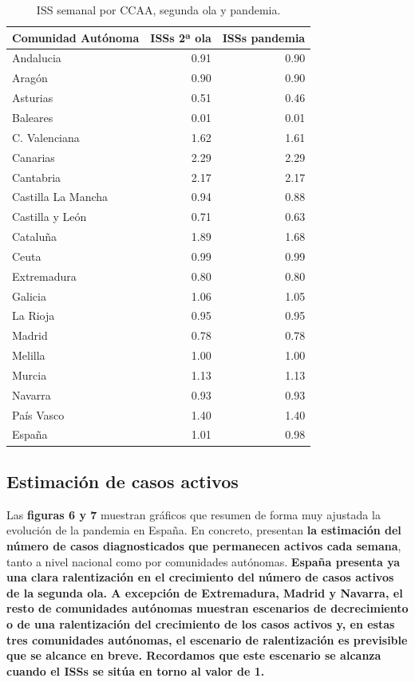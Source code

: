 \documentclass[
  11pt,
]{article}
\begin{document}
\begin{table}[!h]

\caption{\label{tab:tabla3}ISS semanal por CCAA, segunda ola y pandemia.}
\centering
\fontsize{9}{11}\selectfont
\begin{tabular}[t]{l|r|r}
\hline
Comunidad Autónoma & ISSs 2ª ola & ISSs pandemia\\
\hline
Andalucia & 0.91 & 0.90\\
\hline
Aragón & 0.90 & 0.90\\
\hline
Asturias & 0.51 & 0.46\\
\hline
Baleares & 0.01 & 0.01\\
\hline
C. Valenciana & 1.62 & 1.61\\
\hline
Canarias & 2.29 & 2.29\\
\hline
Cantabria & 2.17 & 2.17\\
\hline
Castilla La Mancha & 0.94 & 0.88\\
\hline
Castilla y León & 0.71 & 0.63\\
\hline
Cataluña & 1.89 & 1.68\\
\hline
Ceuta & 0.99 & 0.99\\
\hline
Extremadura & 0.80 & 0.80\\
\hline
Galicia & 1.06 & 1.05\\
\hline
La Rioja & 0.95 & 0.95\\
\hline
Madrid & 0.78 & 0.78\\
\hline
Melilla & 1.00 & 1.00\\
\hline
Murcia & 1.13 & 1.13\\
\hline
Navarra & 0.93 & 0.93\\
\hline
País Vasco & 1.40 & 1.40\\
\hline
España & 1.01 & 0.98\\
\hline
\end{tabular}
\end{table}

\clearpage

\hypertarget{estimaciuxf3n-de-casos-activos}{%
\subsection{Estimación de casos
activos}\label{estimaciuxf3n-de-casos-activos}}

Las \textbf{figuras 6 y 7} muestran gráficos que resumen de forma muy
ajustada la evolución de la pandemia en España. En concreto, presentan
\textbf{la estimación del número de casos diagnosticados que permanecen
activos cada semana}, tanto a nivel nacional como por comunidades
autónomas. \textbf{España presenta ya una clara ralentización en el
crecimiento del número de casos activos de la segunda ola. A excepción
de Extremadura, Madrid y Navarra, el resto de comunidades autónomas
muestran escenarios de decrecimiento o de una ralentización del
crecimiento de los casos activos y, en estas tres comunidades autónomas,
el escenario de ralentización es previsible que se alcance en breve.
Recordamos que este escenario se alcanza cuando el ISSs se sitúa en
torno al valor de 1.}
\end{document}
